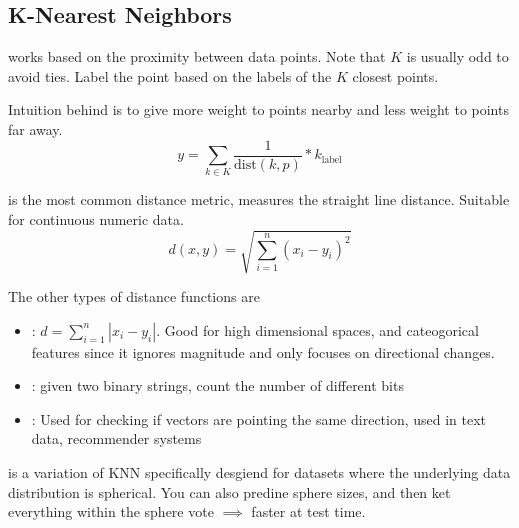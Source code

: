 \documentclass[12pt]{scrartcl}
\begin{document}
\subsection{K-Nearest Neighbors}

\begin{definition}
   works based on the proximity between data points. Note that 
  $K$ is usually odd to avoid ties. Label the point based on the labels of the $K$ closest points.

\end{definition}
  
\begin{note}
  Intuition behind  is to give more weight to points nearby and less 
  weight to points far away.
  \[y = \sum_{k \in K} \frac{1}{\text{dist}(k, p)} * k_{\text{label}}\]
\end{note}


\begin{definition}
   is the most common distance metric, 
  measures the straight line distance. Suitable for continuous numeric data.
  \[d(x,y) = \sqrt{\sum_{i=1}^n (x_i - y_i)^2}\]
\end{definition}

\begin{note}
  The other types of distance functions are 
  \begin{itemize}
    \item {}: $d= \sum_{i=1}^n |x_i - y_i|$. Good for high dimensional spaces, and cateogorical features
    since it ignores magnitude and only focuses on directional changes. 
    \item {}: given two binary strings, count the number of different bits
    \item {}: Used for checking if vectors are pointing the same direction, used in text data, recommender systems
  \end{itemize}
\end{note}

\begin{definition}
   is a variation of KNN specifically desgiend for datasets
  where the underlying data distribution is spherical. You can also predine sphere sizes, and then ket 
  everything within the sphere vote $\implies$ faster at test time.
\end{definition}
\end{document}
